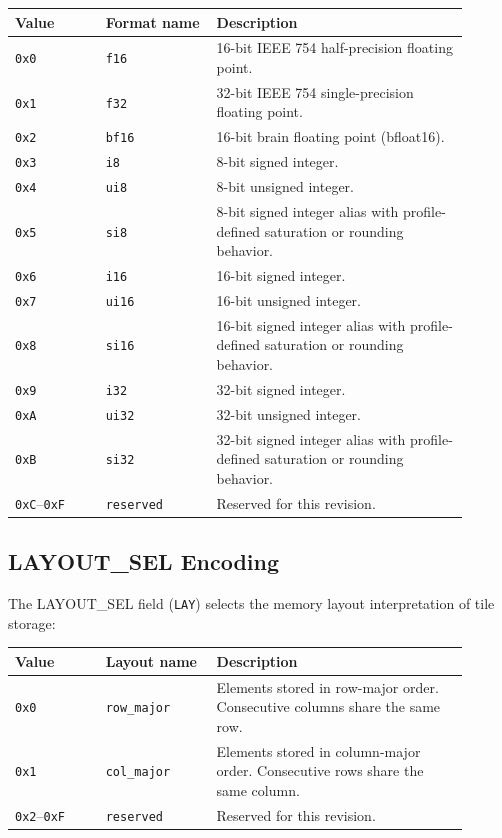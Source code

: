 \begin{longtable}{@{}L{0.18\linewidth}L{0.22\linewidth}L{0.50\linewidth}@{}}
\toprule
Value & Format name & Description \\
\midrule
\texttt{0x0} & \texttt{f16} & 16-bit IEEE 754 half-precision floating point. \\
\texttt{0x1} & \texttt{f32} & 32-bit IEEE 754 single-precision floating point. \\
\texttt{0x2} & \texttt{bf16} & 16-bit brain floating point (bfloat16). \\
\texttt{0x3} & \texttt{i8} & 8-bit signed integer. \\
\texttt{0x4} & \texttt{ui8} & 8-bit unsigned integer. \\
\texttt{0x5} & \texttt{si8} & 8-bit signed integer alias with profile-defined saturation or rounding behavior. \\
\texttt{0x6} & \texttt{i16} & 16-bit signed integer. \\
\texttt{0x7} & \texttt{ui16} & 16-bit unsigned integer. \\
\texttt{0x8} & \texttt{si16} & 16-bit signed integer alias with profile-defined saturation or rounding behavior. \\
\texttt{0x9} & \texttt{i32} & 32-bit signed integer. \\
\texttt{0xA} & \texttt{ui32} & 32-bit unsigned integer. \\
\texttt{0xB} & \texttt{si32} & 32-bit signed integer alias with profile-defined saturation or rounding behavior. \\
\texttt{0xC}--\texttt{0xF} & \texttt{reserved} & Reserved for this revision. \\
\bottomrule
\end{longtable}

\subsection{LAYOUT\_SEL Encoding}
\label{sec:layout_sel}
The LAYOUT\_SEL field (\texttt{LAY}) selects the memory layout interpretation of tile storage:

\begin{longtable}{@{}L{0.18\linewidth}L{0.22\linewidth}L{0.50\linewidth}@{}}
\toprule
Value & Layout name & Description \\
\midrule
\texttt{0x0} & \texttt{row\_major} & Elements stored in row-major order. Consecutive columns share the same row. \\
\texttt{0x1} & \texttt{col\_major} & Elements stored in column-major order. Consecutive rows share the same column. \\
\texttt{0x2}--\texttt{0xF} & \texttt{reserved} & Reserved for this revision. \\
\bottomrule
\end{longtable}

